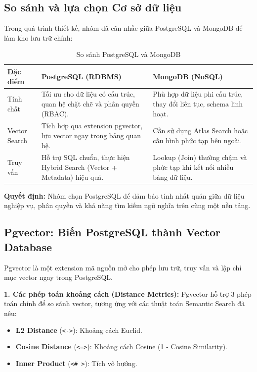 \documentclass[12pt,a4paper]{report}
\begin{document}
\subsection{So sánh và lựa chọn Cơ sở dữ liệu}
Trong quá trình thiết kế, nhóm đã cân nhắc giữa PostgreSQL và MongoDB để làm kho lưu trữ chính:

\begin{table}[H]
\centering
\caption{So sánh PostgreSQL và MongoDB}
\label{tab:db_comparison}
\begin{tabularx}{\textwidth}{|l|X|X|}
\hline
\textbf{Đặc điểm} & \textbf{PostgreSQL (RDBMS)} & \textbf{MongoDB (NoSQL)} \\ \hline
Tính chất & Tối ưu cho dữ liệu có cấu trúc, quan hệ chặt chẽ và phân quyền (RBAC). & Phù hợp dữ liệu phi cấu trúc, thay đổi liên tục, schema linh hoạt. \\ \hline
Vector Search & Tích hợp qua extension pgvector, lưu vector ngay trong bảng quan hệ. & Cần sử dụng Atlas Search hoặc cấu hình phức tạp bên ngoài. \\ \hline
Truy vấn & Hỗ trợ SQL chuẩn, thực hiện Hybrid Search (Vector + Metadata) hiệu quả. & Lookup (Join) thường chậm và phức tạp khi kết nối nhiều bảng dữ liệu. \\ \hline
\end{tabularx}
\end{table}

\textbf{Quyết định:} Nhóm chọn PostgreSQL để đảm bảo tính nhất quán giữa dữ liệu nghiệp vụ, phân quyền và khả năng tìm kiếm ngữ nghĩa trên cùng một nền tảng.

\subsection{Pgvector: Biến PostgreSQL thành Vector Database}
Pgvector là một extension mã nguồn mở cho phép lưu trữ, truy vấn và lập chỉ mục vector ngay trong PostgreSQL.

\textbf{1. Các phép toán khoảng cách (Distance Metrics):} Pgvector hỗ trợ 3 phép toán chính để so sánh vector, tương ứng với các thuật toán Semantic Search đã nêu:
\begin{itemize}
    \item \textbf{L2 Distance} (\texttt{<->}): Khoảng cách Euclid.
    \item \textbf{Cosine Distance} (\texttt{<=>}): Khoảng cách Cosine (1 - Cosine Similarity).
    \item \textbf{Inner Product} (\texttt{<\# >}): Tích vô hướng.
\end{itemize}
\end{document}
